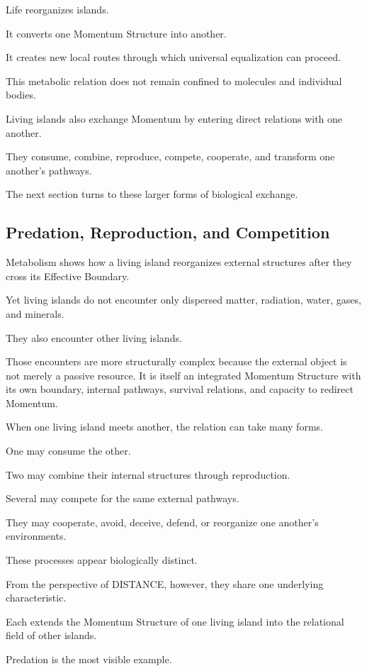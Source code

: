 Life reorganizes islands.

It converts one Momentum Structure into another.

It creates new local routes through which universal equalization can proceed.

This metabolic relation does not remain confined to molecules and individual bodies.

Living islands also exchange Momentum by entering direct relations with one another.

They consume, combine, reproduce, compete, cooperate, and transform one another’s pathways.

The next section turns to these larger forms of biological exchange.

\subsection*{\textbf{Predation, Reproduction, and Competition}}


Metabolism shows how a living island reorganizes external structures after they cross its Effective Boundary.

Yet living islands do not encounter only dispersed matter, radiation, water, gases, and minerals.

They also encounter other living islands.

Those encounters are more structurally complex because the external object is not merely a passive resource. It is itself an integrated Momentum Structure with its own boundary, internal pathways, survival relations, and capacity to redirect Momentum.

When one living island meets another, the relation can take many forms.

One may consume the other.

Two may combine their internal structures through reproduction.

Several may compete for the same external pathways.

They may cooperate, avoid, deceive, defend, or reorganize one another’s environments.

These processes appear biologically distinct.

From the perspective of DISTANCE, however, they share one underlying characteristic.

Each extends the Momentum Structure of one living island into the relational field of other islands.

Predation is the most visible example.

